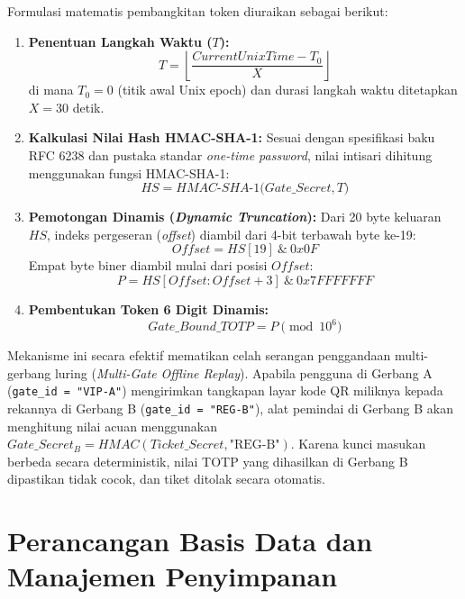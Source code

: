 Formulasi matematis pembangkitan token diuraikan sebagai berikut:
\begin{enumerate}
    \item \textbf{Penentuan Langkah Waktu ($T$):}
    \begin{equation}
        T = \left\lfloor \frac{CurrentUnixTime - T_0}{X} \right\rfloor
    \end{equation}
    di mana $T_0 = 0$ (titik awal Unix epoch) dan durasi langkah waktu ditetapkan $X = 30$ detik.
    \item \textbf{Kalkulasi Nilai Hash HMAC-SHA-1:} Sesuai dengan spesifikasi baku RFC 6238 dan pustaka standar \textit{one-time password}, nilai intisari dihitung menggunakan fungsi HMAC-SHA-1:
    \begin{equation}
        HS = HMAC\text{-}SHA\text{-}1\Big(Gate\_Secret, T\Big)
    \end{equation}
    \item \textbf{Pemotongan Dinamis (\textit{Dynamic Truncation}):} Dari 20 byte keluaran $HS$, indeks pergeseran (\textit{offset}) diambil dari 4-bit terbawah byte ke-19:
    \begin{equation}
        Offset = HS[19] \ \& \ 0x0F
    \end{equation}
    Empat byte biner diambil mulai dari posisi $Offset$:
    \begin{equation}
        P = HS[Offset : Offset+3] \ \& \ 0x7FFFFFFF
    \end{equation}
    \item \textbf{Pembentukan Token 6 Digit Dinamis:}
    \begin{equation}
        Gate\_Bound\_TOTP = P \pmod{10^6}
    \end{equation}
\end{enumerate}

Mekanisme ini secara efektif mematikan celah serangan penggandaan multi-gerbang luring (\textit{Multi-Gate Offline Replay}). Apabila pengguna di Gerbang A (\texttt{gate\_id = "VIP-A"}) mengirimkan tangkapan layar kode QR miliknya kepada rekannya di Gerbang B (\texttt{gate\_id = "REG-B"}), alat pemindai di Gerbang B akan menghitung nilai acuan menggunakan $Gate\_Secret_{B} = HMAC(Ticket\_Secret, \text{"REG-B"})$. Karena kunci masukan berbeda secara deterministik, nilai TOTP yang dihasilkan di Gerbang B dipastikan tidak cocok, dan tiket ditolak secara otomatis.

\section{Perancangan Basis Data dan Manajemen Penyimpanan}
\label{sec:perancangan_basis_data}

